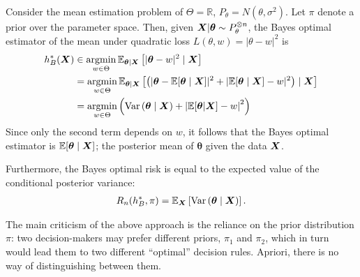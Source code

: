 \documentclass[12pt]{article}
\begin{document}
\begin{example}
\label{example:bayes-optimal-mean-estimation} Consider the mean estimation problem of $\Theta = \mathbb{R}$, $P_\theta = N(\theta, \sigma^2)$. Let $\pi$ denote a prior over the parameter space. Then, given ${\boldsymbol X}|\boldsymbol{\theta} \sim P_{\theta}^{\otimes n}$, the Bayes optimal estimator of the mean under quadratic loss $L(\theta, w)= |\theta - w|^2$ is 
\begin{align}
	h^*_B({\boldsymbol X}) &\in \operatorname*{argmin}_{w \in \Theta} \mathbb{E}_{\boldsymbol{\theta}|{\boldsymbol X}}\left[ |\boldsymbol{\theta} - w|^2 \mid {\boldsymbol X} \right] \\ 
	&= \operatorname*{argmin}_{w \in \Theta} \mathbb{E}_{\boldsymbol{\theta} \mid {\boldsymbol X}}\left[ \left( |\boldsymbol{\theta} - \mathbb{E}[\boldsymbol{\theta} \mid {\boldsymbol X}]|^2 + |\mathbb{E}[\boldsymbol{\theta} \mid {\boldsymbol X}] - w|^2  \right) \mid {\boldsymbol X}\right] \\
	& =  \operatorname*{argmin}_{w \in \Theta} \left( \mathrm{Var}\left( \boldsymbol{\theta} \mid {\boldsymbol X} \right) +  \left\lvert \mathbb{E}[\boldsymbol{\theta}|{\boldsymbol X}] - w \right\rvert^2  \right)
\end{align}
Since only the second term depends on $w$, it follows that the Bayes optimal estimator is $\mathbb{E}[\boldsymbol{\theta}\mid {\boldsymbol X}]$; the posterior mean of $\boldsymbol{\theta}$ given the data ${\boldsymbol X}$. 

Furthermore, the Bayes optimal risk is equal to the expected value of the conditional posterior variance: 
\begin{align}
R_n(h^*_B, \pi) = \mathbb{E}_{{\boldsymbol X}}\left[ \mathrm{Var}\left( \boldsymbol{\theta} \mid {\boldsymbol X} \right) \right]. 
\end{align}
% 
\end{example}

The main criticism of the above approach is the reliance on the prior distribution $\pi$: two decision-makers may prefer different priors, $\pi_1$ and $\pi_2$, which in turn would lead them to two different ``optimal'' decision rules. Apriori, there is no way of distinguishing between them. 
\end{document}
